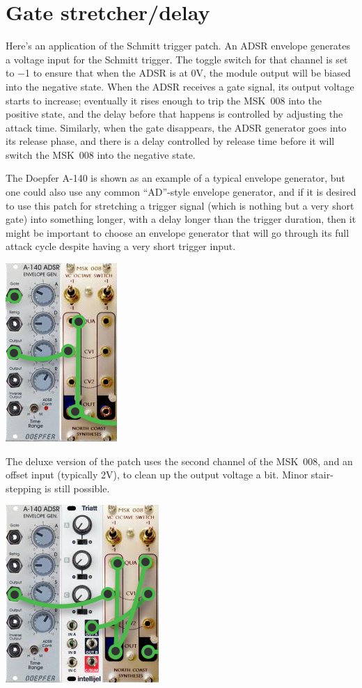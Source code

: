\section{Gate stretcher/delay}

Here's an application of the Schmitt trigger patch.  An ADSR envelope
generates a voltage input for the Schmitt trigger.  The toggle switch for
that channel is set to $-$1 to ensure that when the ADSR is at 0V, the
module output will be biased into the negative state.  When the ADSR
receives a gate signal, its output voltage starts to increase; eventually it
rises enough to trip the MSK~008 into the positive state, and the delay
before that happens is controlled by adjusting the attack time.  Similarly,
when the gate disappears, the ADSR generator goes into its release phase,
and there is a delay controlled by release time before it will switch the
MSK~008 into the negative state.

The Doepfer A-140 is shown as an example of a typical envelope generator,
but one could also use any common ``AD''-style envelope generator, and if it
is desired to use this patch for stretching a trigger signal (which is
nothing but a very short gate) into something longer, with a delay longer
than the trigger duration, then it might be important to choose an envelope
generator that will go through its full attack cycle despite having a very
short trigger input.

{\hspace*{\fill}\includegraphics[scale=0.8]{patch6.png}\hspace*{\fill}\par} 

The deluxe version of the patch uses the second channel of the MSK~008, and
an offset input (typically 2V), to clean up the output voltage a bit. 
Minor stair-stepping is still possible.

{\hspace*{\fill}\includegraphics[scale=0.8]{patch9.png}\hspace*{\fill}\par} 
